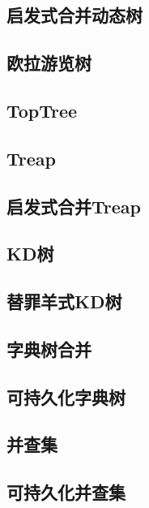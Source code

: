 \documentclass{article}
\begin{document}
\subsection{启发式合并动态树} 

\subsection{欧拉游览树} 

\subsection{TopTree} 


\subsection{Treap} 

\subsection{启发式合并Treap} 


\subsection{KD树} 

\subsection{替罪羊式KD树} 


\subsection{字典树合并} 

\subsection{可持久化字典树} 


\subsection{并查集} 

\subsection{可持久化并查集} 

\end{document}

